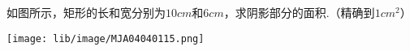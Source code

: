 如图所示，矩形的长和宽分别为$10cm$和$6cm$，求阴影部分的面积.（精确到$1cm^2$）

\begin{center}
    \texttt{[image: lib/image/MJA04040115.png]}
\end{center}